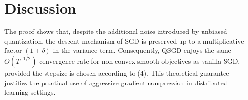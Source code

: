 \documentclass{article}
\begin{document}
\section*{Discussion}
The proof shows that, despite the additional noise introduced by unbiased quantization, the descent mechanism of SGD is preserved up to a multiplicative factor $(1+\delta)$ in the variance term. Consequently, QSGD enjoys the same $O(T^{-1/2})$ convergence rate for non‑convex smooth objectives as vanilla SGD, provided the stepsize is chosen according to (4). This theoretical guarantee justifies the practical use of aggressive gradient compression in distributed learning settings.
\end{document}
